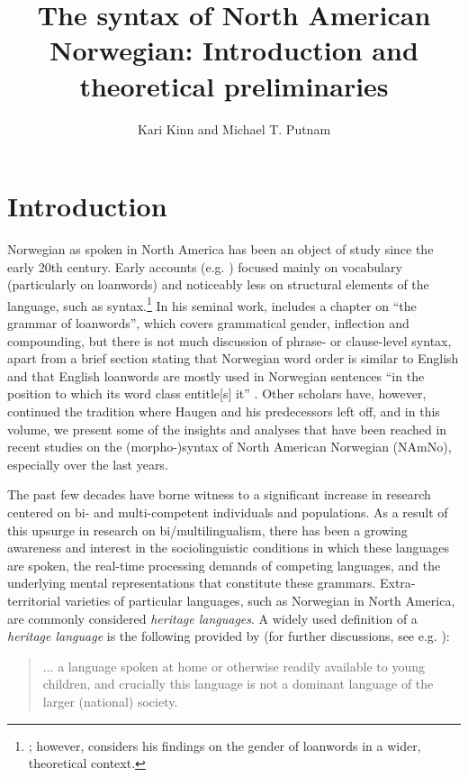 \documentclass[output=paper,colorlinks,citecolor=brown]{langscibook}
\author{Kari Kinn\orcid{}\affiliation{University of Bergen} and Michael T. Putnam\orcid{}\affiliation{Penn State University}}
\title[Introduction and theoretical preliminaries]
      {The syntax of North American Norwegian: Introduction and theoretical preliminaries}
\begin{document}
\maketitle

\section{Introduction} \label{intro}


Norwegian as spoken in North America has been an object of study since the early 20th century. Early accounts (e.g.  \citealt{Flom1900, flom1903gender, flom1926englishloanwords, Flaten1900}) focused mainly on vocabulary (particularly on loanwords) and noticeably less on structural elements of the language, such as syntax.\footnote{\citet{flom1903gender}; however, considers his findings on the gender of loanwords in a wider, theoretical context.} In his seminal work, \citet{haugen1953} includes a chapter on ``the grammar of loanwords'',   which covers grammatical gender, inflection and compounding, but there is not much discussion of phrase- or clause-level syntax, apart from a brief section stating that Norwegian word order is similar to English and that English loanwords are mostly used in Norwegian sentences ``in the position to which its word class entitle[s] it'' \citep[457--458]{haugen1953}. Other scholars have, however, continued the tradition where Haugen and his predecessors left off, and in this volume, we present some of the insights and analyses that have been reached in recent studies on the \mbox{(morpho-)}syntax of North American Norwegian (NAmNo), especially over the last years. 

The past few decades have borne witness to a significant increase in research centered on bi- and multi-competent individuals and populations. As a result of this upsurge in research on bi/multilingualism, there has been a growing awareness and interest in the sociolinguistic conditions in which these languages are spoken, the real-time processing demands of competing languages, and the underlying mental representations that constitute these grammars. Extra-territorial varieties of particular languages, such as Norwegian in North America, are commonly considered \textit{heritage languages}. A widely used definition of a \textit{heritage language} is the following provided by \citet[156]{rothman09} (for further discussions, see e.g. \citealt{polinsky18}):

\begin{quote}
    ... a language spoken at home or otherwise readily available to young children, and crucially this language is not a dominant language of the larger (national) society.
\end{quote}
\end{document}
